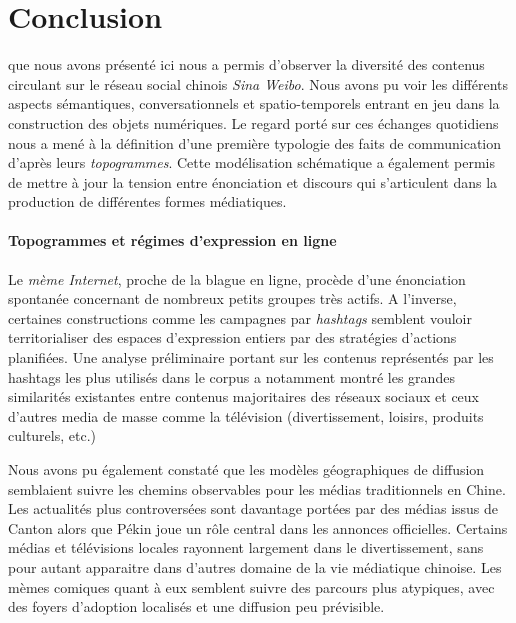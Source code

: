 \chapter*{Conclusion}

 que nous avons présenté ici nous a permis d'observer la diversité des contenus circulant sur le réseau social chinois \textit{Sina Weibo}. Nous avons pu voir les différents aspects sémantiques, conversationnels et spatio-temporels entrant en jeu dans la construction des objets numériques. Le regard porté sur ces échanges quotidiens nous a  mené à la définition d'une première typologie des faits de communication d'après leurs \textit{topogrammes}. Cette modélisation schématique a également permis de mettre à jour la tension entre énonciation et discours qui s'articulent dans la production de différentes formes médiatiques.

\subsubsection{Topogrammes et régimes d'expression en ligne}
Le \textit{mème Internet}, proche de la blague en ligne, procède d'une énonciation spontanée concernant de nombreux petits groupes très actifs. A l'inverse, certaines constructions comme les campagnes par \textit{hashtags} semblent vouloir territorialiser des espaces d'expression entiers par des stratégies d'actions planifiées. Une analyse préliminaire portant sur les contenus représentés par les hashtags les plus utilisés dans le corpus a notamment montré les grandes similarités existantes entre contenus majoritaires des réseaux sociaux et ceux d'autres media de masse comme la télévision (divertissement, loisirs, produits culturels, etc.)

Nous avons pu également constaté que les modèles géographiques de diffusion semblaient suivre les chemins observables pour les médias traditionnels en Chine. Les actualités plus controversées sont davantage portées par des médias issus de Canton alors que Pékin joue un rôle central dans les annonces officielles. Certains médias et télévisions locales rayonnent largement dans le  divertissement, sans pour autant apparaitre dans d'autres domaine de la vie médiatique chinoise. Les mèmes comiques quant à eux semblent suivre des parcours plus atypiques, avec des foyers d'adoption localisés et une diffusion peu prévisible.

